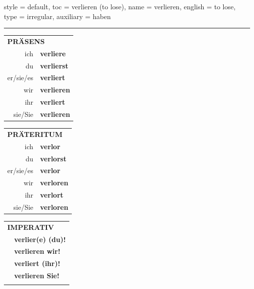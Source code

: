 \begin{verbentry}{
  style = {default},
  toc = {verlieren (to lose)},
  name = {verlieren},
  english = {to lose},
  type = {irregular},
  auxiliary = {haben}
}
 
    
     \vspace{5pt}

    \hrule
    
    \vspace{5pt}

  \begin{tabular}{rl}
     \multicolumn{2}{l}{\textbf{PRÄSENS} }\\
    ich & \textbf{verliere}\\
    du & \textbf{verlierst}\\
    er/sie/es & \textbf{verliert}\\
    wir & \textbf{verlieren}\\
    ihr & \textbf{verliert}\\
    sie/Sie & \textbf{verlieren}\\
  \end{tabular}
  \hfill
     \begin{tabular}{rl}
    \multicolumn{2}{l}{\textbf{PRÄTERITUM} }\\
    ich & \textbf{verlor}\\
    du & \textbf{verlorst}\\
    er/sie/es & \textbf{verlor}\\
    wir & \textbf{verloren}\\
    ihr & \textbf{verlort}\\
    sie/Sie & \textbf{verloren}\\
  \end{tabular}
  \hfill
  \begin{tabular}{rl}
     \multicolumn{2}{l}{\textbf{IMPERATIV} }\\
   & \textbf{verlier(e) (du)!}\\
   & \textbf{verlieren wir!}\\
   & \textbf{verliert (ihr)!}\\
   & \textbf{verlieren Sie!}\\
   & \vspace{10pt}
  \end{tabular}

    \vspace{10pt}


\end{verbentry}
